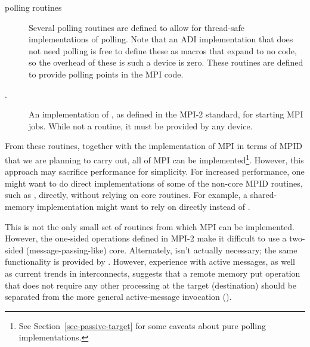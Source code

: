 \documentclass{article}
\begin{document}
\begin{description}

\item[polling routines]Several polling routines are defined to allow
for thread-safe implementations of polling.  Note that an ADI
implementation that does not need polling is free to define these as
macros that expand to no code, so the overhead of these is such a
device is zero.  These routines are defined to provide polling points
in the MPI code.


\item[.] An implementation of , as defined in the
  MPI-2 standard, for starting MPI jobs.  While not a routine, it must be 
  provided by any device.  
\end{description}
From these routines, together with the implementation of MPI in terms of MPID
that we are planning to carry out, all of MPI can be implemented\footnote{See
Section~\ref{sec-passive-target} for some caveats about pure polling
implementations.}.  However, this approach may sacrifice performance
for simplicity.  For increased performance, one might want to do direct
implementations of some of the non-core MPID routines, such as
, directly, without relying on core routines.  For example, a
shared-memory implementation might want to rely on  directly
instead of .

This is not the only small set of routines from which MPI can be
implemented.  However, the one-sided operations defined in MPI-2 make
it difficult to use a two-sided (message-passing-like) core.
Alternately,  isn't actually necessary; the same
functionality is provided by .  However, experience
with active messages, as well as current trends in interconnects,
suggests that a remote memory put operation that does not require any
other processing at the target (destination) should be separated from
the more general active-message invocation ().
\end{document}
